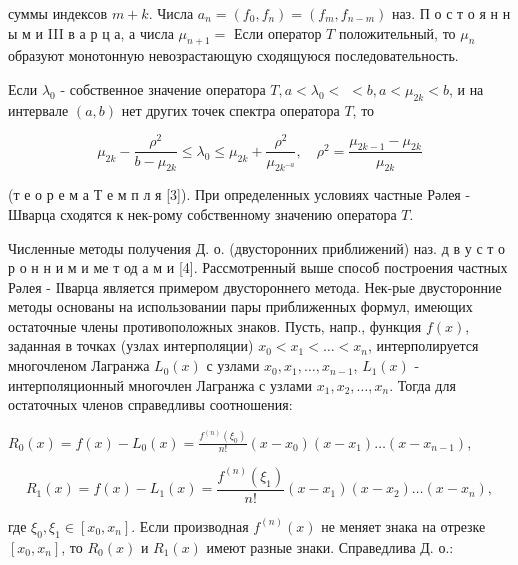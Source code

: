 \documentclass[10pt]{article}
\begin{document}
суммы индексов $m+k$. Числа $a_{n}=\left(f_{0}, f_{n}\right)=\left(f_{m}, f_{n-m}\right)$ наз. П о с т о я н н ы м и III в а р ц а, а числа $\mu_{n+1}=$ Если оператор $T$ положительный, то $\mu_{n}$ образуют монотонную невозрастающую сходящуюся последовательность.



Если $\lambda_{0}$ - собственное значение оператора $T, a<\lambda_{0}<$ $<b, a<\mu_{2 k}<b$, и на интервале $(a, b)$ нет других точек спектра оператора $T$, то



\[

\mu_{2 k}-\frac{\rho^{2}}{b-\mu_{2 k}} \leqslant \lambda_{0} \leqslant \mu_{2 k}+\frac{\rho^{2}}{\mu_{2 k^{-a}}}, \quad \rho^{2}=\frac{\mu_{2 k-1}-\mu_{2 k}}{\mu_{2 k}}

\]



(т е о р е м а Т е м п л я [3]). При определенных условиях частные Рәлея - Шварца сходятся к нек-рому собственному значению оператора $T$.



Численные методы получения Д. о. (двусторонних приближений) наз. д в у с т о р о н н и м и ме т од а м и [4]. Рассмотренный выше способ построения частных Рәлея - ІІварца является примером двустороннего метода. Нек-рые двусторонние методы основаны на использовании пары приближенных формул, имеющих остаточные члены противоположных знаков. Пусть, напр., функция $f(x)$, заданная в точках (узлах интерполяции) $x_{0}<x_{1}<\ldots<x_{n}$, интерполируется многочленом Лагранжа $L_{0}(x)$ с узлами $x_{0}, x_{1}, \ldots, x_{n-1}$, $L_{1}(x)$ - интерполяционный многочлен Лагранжа с узлами $x_{1}, x_{2}, \ldots, x_{n}$. Тогда для остаточных членов справедливы соотношения:



$R_{0}(x)=f(x)-L_{0}(x)=\frac{f^{(n)}\left(\xi_{0}\right)}{n !}\left(x-x_{0}\right)\left(x-x_{1}\right) \ldots\left(x-x_{n-1}\right)$,



\[

R_{1}(x)=f(x)-L_{1}(x)=\frac{f^{(n)}\left(\xi_{1}\right)}{n !}\left(x-x_{1}\right)\left(x-x_{2}\right) \ldots\left(x-x_{n}\right),

\]



где $\xi_{0}, \xi_{1} \in\left[x_{0}, x_{n}\right]$. Если производная $f^{(n)}(x)$ не меняет знака на отрезке $\left[x_{0}, x_{n}\right]$, то $R_{0}(x)$ и $R_{1}(x)$ имеют разные знаки. Справедлива Д. о.:
\end{document}
